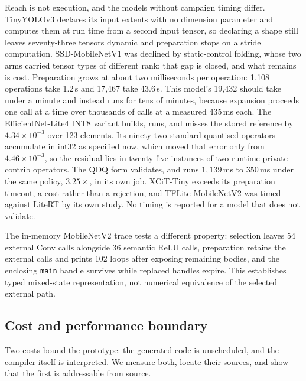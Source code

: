 \documentclass[sigplan,anonymous,review]{acmart}
\begin{document}
Reach is not execution, and the models without campaign timing differ. TinyYOLOv3 declares its input extents with no dimension parameter and
computes them at run time from a second input tensor, so declaring a shape still
leaves seventy-three tensors dynamic and preparation stops on a stride
computation. SSD-MobileNetV1 was declined by static-control
folding, whose two arms carried tensor types of different rank; that gap is
closed, and what remains is cost. Preparation grows at about two milliseconds per
operation: 1{,}108 operations take 1.2\,s and 17{,}467 take 43.6\,s. This
model's 19{,}432 should take under a minute and instead runs for tens of minutes,
because expansion proceeds one call at a time over thousands of calls at a
measured 435\,ms each. The
EfficientNet-Lite4 INT8 variant builds, runs, and misses the stored reference by
$4.34\times10^{-3}$ over 123 elements. Its ninety-two standard quantised operators
accumulate in int32 as specified now, which moved that error only from
$4.46\times10^{-3}$, so the residual lies in twenty-five instances of two
runtime-private contrib operators. The QDQ form validates, and runs $1{,}139$\,ms
to $350$\,ms under the same policy, $3.25\times$, in its own job. XCiT-Tiny exceeds its preparation timeout, a cost rather
than a rejection, and TFLite MobileNetV2 was timed against LiteRT by its own
study. No timing is reported for a model that does not validate.

The in-memory MobileNetV2 trace tests a different property: selection leaves
54 external Conv calls alongside 36 semantic ReLU calls, preparation retains
the external calls and prints 102 loops after exposing remaining bodies, and
the enclosing \texttt{main} handle survives while replaced handles expire.
This establishes typed mixed-state representation, not numerical equivalence
of the selected external path.

\subsection{Cost and performance boundary}
\label{sec:eval-code}
\label{sec:eval-work}
Two costs bound the prototype: the generated code is unscheduled, and the
compiler itself is interpreted. We measure both, locate their sources, and
show that the first is addressable from source.
\end{document}
